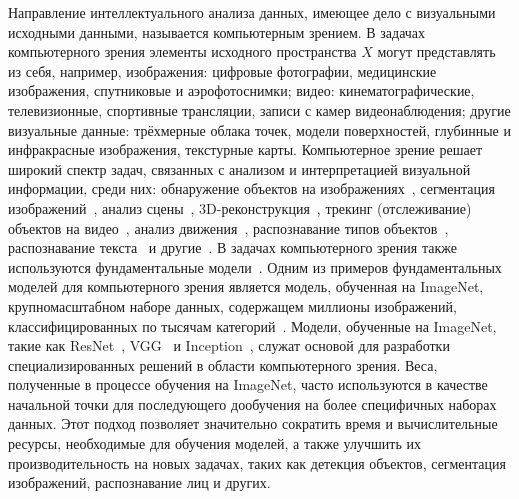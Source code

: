 Направление интеллектуального анализа данных, имеющее дело с визуальными исходными данными, называется компьютерным зрением. В задачах компьютерного зрения элементы исходного пространства $X$ могут представлять из себя, например, изображения: цифровые фотографии, медицинские изображения, спутниковые и аэрофотоснимки; видео: кинематографические, телевизионные, спортивные трансляции, записи с камер видеонаблюдения; другие визуальные данные: трёхмерные облака точек, модели поверхностей, глубинные и инфракрасные изображения, текстурные карты. Компьютерное зрение решает широкий спектр задач, связанных с анализом и интерпретацией визуальной информации, среди них: обнаружение объектов на изображениях~\cite{chen, kaur, liul, xiao, lin, felzenszwalb, girshickr, girshick, rens, hek, liuw, redmon}, сегментация изображений~\cite{csurka, soylu, wangy, mittal, jiangb}, анализ сцены~\cite{wangx, valipoor, fan}, 3D-реконструкция~\cite{zhoul, samavati, hanxf, ham}, трекинг (отслеживание) объектов на видео~\cite{hassan, kadam, dong}, анализ движения~\cite{kaushik, hesse, colyer}, распознавание типов объектов~\cite{khalil, chatterjee, uijlings, vizilter, sebryakov}, распознавание текста~\cite{moudgil, ranjan, islam} и другие~\cite{davies, prince, szeliski, jain}. В задачах компьютерного зрения также используются фундаментальные модели~\cite{awais, wangw}. Одним из примеров фундаментальных моделей для компьютерного зрения является модель, обученная на ImageNet, крупномасштабном наборе данных, содержащем миллионы изображений, классифицированных по тысячам категорий~\cite{krizhevsky}. Модели, обученные на ImageNet, такие как ResNet~\cite{he, xie}, VGG~\cite{simonyan} и Inception~\cite{szegedy}, служат основой для разработки специализированных решений в области компьютерного зрения. Веса, полученные в процессе обучения на ImageNet, часто используются в качестве начальной точки для последующего дообучения на более специфичных наборах данных. Этот подход позволяет значительно сократить время и вычислительные ресурсы, необходимые для обучения моделей, а также улучшить их производительность на новых задачах, таких как детекция объектов, сегментация изображений, распознавание лиц и других.


